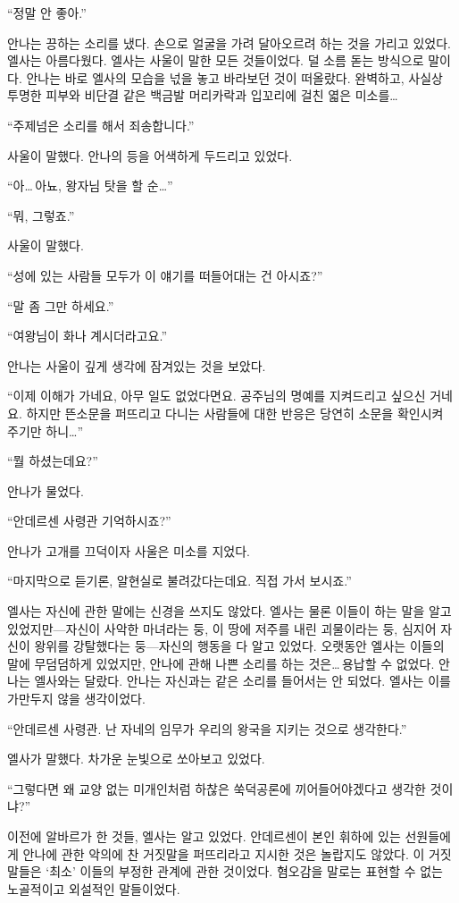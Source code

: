 ``정말 안 좋아.''

안나는 끙하는 소리를 냈다. 손으로 얼굴을 가려 달아오르려 하는 것을 가리고 있었다. 엘사는 아름다웠다. 엘사는 사울이 말한 모든 것들이었다. 덜 소름 돋는 방식으로 말이다. 안나는 바로 엘사의 모습을 넋을 놓고 바라보던 것이 떠올랐다. 완벽하고, 사실상 투명한 피부와 비단결 같은 백금발 머리카락과 입꼬리에 걸친 엷은 미소를\ldots

``주제넘은 소리를 해서 죄송합니다.''

사울이 말했다. 안나의 등을 어색하게 두드리고 있었다.

``아\ldots\,아뇨, 왕자님 탓을 할 순\ldots''

``뭐, 그렇죠.''

사울이 말했다.

``성에 있는 사람들 모두가 이 얘기를 떠들어대는 건 아시죠?''

``말 좀 그만 하세요.''

``여왕님이 화나 계시더라고요.''

안나는 사울이 깊게 생각에 잠겨있는 것을 보았다.

``이제 이해가 가네요, 아무 일도 없었다면요. 공주님의 명예를 지켜드리고 싶으신 거네요. 하지만 뜬소문을 퍼뜨리고 다니는 사람들에 대한 반응은 당연히 소문을 확인시켜 주기만 하니\ldots''

``뭘 하셨는데요?''

안나가 물었다.

``안데르센 사령관 기억하시죠?''

안나가 고개를 끄덕이자 사울은 미소를 지었다.

``마지막으로 듣기론, 알현실로 불려갔다는데요. 직접 가서 보시죠.''

\textbreak

엘사는 자신에 관한 말에는 신경을 쓰지도 않았다. 엘사는 물론 이들이 하는 말을 알고 있었지만—자신이 사악한 마녀라는 둥, 이 땅에 저주를 내린 괴물이라는 둥, 심지어 자신이 왕위를 강탈했다는 둥—자신의 행동을 다 알고 있었다. 오랫동안 엘사는 이들의 말에 무덤덤하게 있었지만, 안나에 관해 나쁜 소리를 하는 것은\ldots\,용납할 수 없었다. 안나는 엘사와는 달랐다. 안나는 자신과는 같은 소리를 들어서는 안 되었다. 엘사는 이를 가만두지 않을 생각이었다.

``안데르센 사령관. 난 자네의 임무가 우리의 왕국을 지키는 것으로 생각한다.''

엘사가 말했다. 차가운 눈빛으로 쏘아보고 있었다.

``그렇다면 왜 교양 없는 미개인처럼 하찮은 쑥덕공론에 끼어들어야겠다고 생각한 것이냐?''

이전에 알바르가 한 것들, 엘사는 알고 있었다. 안데르센이 본인 휘하에 있는 선원들에게 안나에 관한 악의에 찬 거짓말을 퍼뜨리라고 지시한 것은 놀랍지도 않았다. 이 거짓말들은 `최소' 이들의 부정한 관계에 관한 것이었다. 혐오감을 말로는 표현할 수 없는 노골적이고 외설적인 말들이었다.

